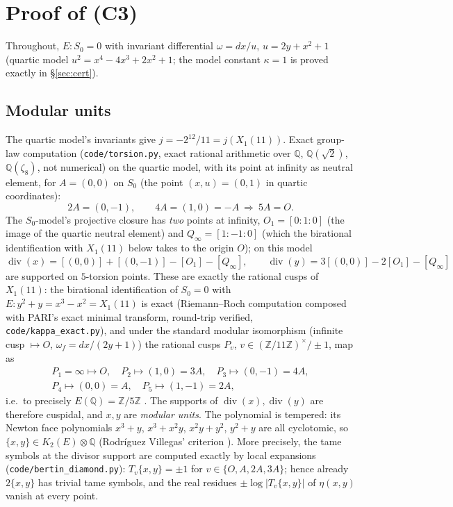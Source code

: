 \documentclass[11pt]{amsart}
\theoremstyle{definition}
\theoremstyle{remark}
\newcommand{\Q}{\mathbb{Q}}
\newcommand{\Z}{\mathbb{Z}}
\DeclareMathOperator{\divisor}{div}
\begin{document}
\section{Proof of (C3)}
\label{sec:proof}

Throughout, $E: S_0=0$ with invariant differential $\omega=dx/u$,
$u=2y+x^2+1$ (quartic model $u^2=x^4-4x^3+2x^2+1$; the model constant
$\kappa=1$ is proved exactly in \S\ref{sec:cert}).

\subsection{Modular units}

The quartic model's invariants give $j=-2^{12}/11=j(X_1(11))$. Exact group-law
computation (\texttt{code/torsion.py}, exact rational arithmetic over $\Q$,
$\Q(\sqrt2)$, $\Q(\zeta_8)$, not numerical) on the quartic model, with its
point at infinity as neutral element, for $A=(0,0)$ on $S_0$ (the point
$(x,u)=(0,1)$ in quartic coordinates):
\[
  2A=(0,-1),\qquad 4A=(1,0)=-A\ \Longrightarrow\ 5A=O.
\]
The $S_0$-model's projective closure has \emph{two} points at infinity,
$O_1=[0:1:0]$ (the image of the quartic neutral element) and
$Q_\infty=[1:-1:0]$ (which the birational identification with $X_1(11)$
below takes to the origin $O$); on this model
\[
  \divisor(x)=[(0,0)]+[(0,-1)]-[O_1]-[Q_\infty],\qquad
  \divisor(y)=3[(0,0)]-2[O_1]-[Q_\infty]
\]
are supported on $5$-torsion points. These are exactly the rational cusps
of $X_1(11)$: the birational identification of $S_0=0$ with
$E:y^2+y=x^3-x^2=X_1(11)$ is exact (Riemann--Roch computation composed
with PARI's exact minimal transform, round-trip verified,
\texttt{code/kappa\_exact.py}), and under the standard modular
isomorphism (infinite cusp $\mapsto O$, $\omega_f=dx/(2y+1)$) the rational
cusps $P_v$, $v\in(\Z/11\Z)^\times/\pm1$, map as
\[
\begin{gathered}
  P_1=\infty\mapsto O,\quad
  P_2\mapsto(1,0)=3A,\quad
  P_3\mapsto(0,-1)=4A,\\
  P_4\mapsto(0,0)=A,\quad
  P_5\mapsto(1,-1)=2A,
\end{gathered}
\]
i.e.\ to precisely $E(\Q)=\Z/5\Z$
\cite[proof of Thm.~8, (3.152)]{Brunault}. The supports of
$\divisor(x),\divisor(y)$ are therefore cuspidal, and $x,y$ are
\emph{modular units}. The polynomial is tempered: its Newton face polynomials
$x^3+y$, $x^3+x^2y$, $x^2y+y^2$, $y^2+y$ are all cyclotomic, so
$\{x,y\}\in K_2(E)\otimes\Q$ (Rodr\'iguez Villegas' criterion \cite{RV}).
More precisely, the tame symbols at the divisor support are computed
exactly by local expansions (\texttt{code/bertin\_diamond.py}):
$T_v\{x,y\}=\pm1$ for $v\in\{O,A,2A,3A\}$; hence already $2\{x,y\}$ has
trivial tame symbols, and the real residues $\pm\log|T_v\{x,y\}|$ of
$\eta(x,y)$ vanish at every point.
\end{document}
